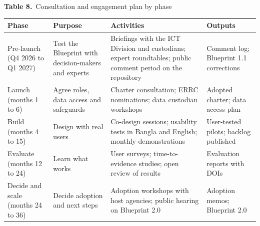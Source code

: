 \documentclass[border=10pt]{standalone}
\begin{document}
\begin{minipage}{17cm}
{\large\bfseries Table 8.}\ {\large Consultation and engagement plan by phase}\par\vspace{7pt}
\small
{}
\begin{tabularx}{\linewidth}{@{}>{\hsize=0.744\hsize\raggedright\arraybackslash}X>{\hsize=1.302\hsize\raggedright\arraybackslash}X>{\hsize=1.209\hsize\raggedright\arraybackslash}X>{\hsize=0.744\hsize\raggedright\arraybackslash}X@{}}
\arrayrulecolor{bapilrule}\toprule
\rowcolor{white}\textbf{Phase} & \textbf{Purpose} & \textbf{Activities} & \textbf{Outputs} \\
\midrule
Pre-launch (Q4 2026 to Q1 2027) & Test the Blueprint with decision-makers and experts & Briefings with the ICT Division and custodians; expert roundtables; public comment period on the repository & Comment log; Blueprint 1.1 corrections \\
Launch (months 1 to 6) & Agree roles, data access and safeguards & Charter consultation; ERRC nominations; data custodian workshops & Adopted charter; data access plan \\
Build (months 4 to 15) & Design with real users & Co-design sessions; usability tests in Bangla and English; monthly demonstrations & User-tested pilots; backlog published \\
Evaluate (months 12 to 24) & Learn what works & User surveys; time-to-evidence studies; open review of results & Evaluation reports with DOIs \\
Decide and scale (months 24 to 36) & Decide adoption and next steps & Adoption workshops with host agencies; public hearing on Blueprint 2.0 & Adoption memos; Blueprint 2.0 \\
\bottomrule
\end{tabularx}
\par{}
\end{minipage}
\end{document}
